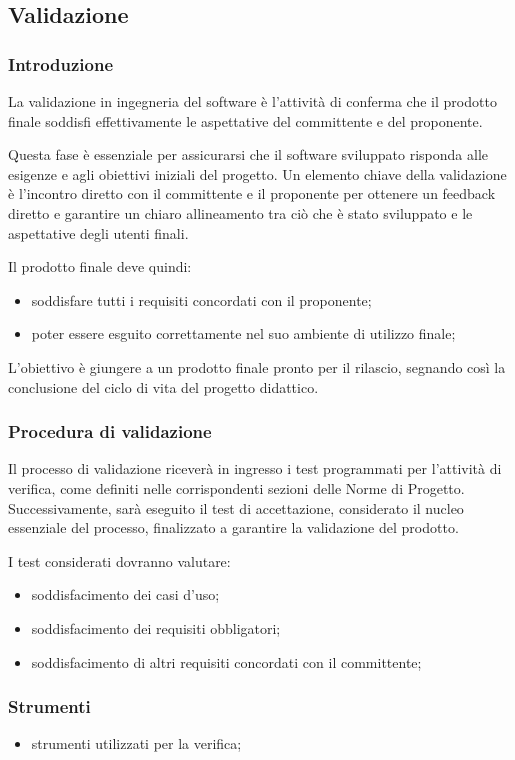 \subsection{Validazione}

\subsubsection{Introduzione}
La validazione in ingegneria del software è l'attività di conferma che il prodotto finale soddisfi effettivamente le aspettative del committente e del proponente.

Questa fase è essenziale per assicurarsi che il software sviluppato risponda alle esigenze e agli obiettivi iniziali del progetto.
Un elemento chiave della validazione è l'incontro diretto con il committente e il proponente per ottenere un feedback diretto e garantire un chiaro allineamento tra ciò che è stato sviluppato e le aspettative degli utenti finali.

Il prodotto finale deve quindi:
\begin{itemize}
    \item 
        soddisfare tutti i requisiti concordati con il proponente;
    \item 
        poter essere esguito correttamente nel suo ambiente di utilizzo finale;
\end{itemize}

L'obiettivo è giungere a un prodotto finale pronto per il rilascio, segnando così la conclusione del ciclo di vita del progetto didattico.

\subsubsection{Procedura di validazione}
Il processo di validazione riceverà in ingresso i test programmati per l'attività di verifica, come definiti nelle corrispondenti sezioni delle Norme di Progetto. Successivamente, sarà eseguito il test di accettazione, considerato il nucleo essenziale del processo, finalizzato a garantire la validazione del prodotto.

I test considerati dovranno valutare:
\begin{itemize}
    \item 
        soddisfacimento dei casi d’uso;
    \item 
        soddisfacimento dei requisiti obbligatori;
    \item 
        soddisfacimento di altri requisiti concordati con il committente;
\end{itemize}

\subsubsection{Strumenti}
\begin{itemize}
    \item 
        strumenti utilizzati per la verifica;
\end{itemize}

